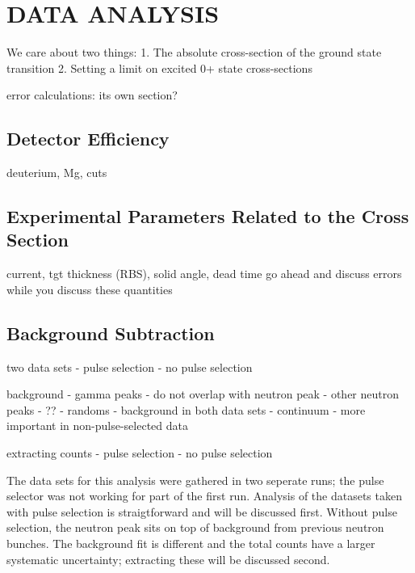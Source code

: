 %
%
%
%
%
%
%
%

%
%

\chapter{DATA ANALYSIS}
\label{chap:dataAnalysis}
We care about two things:
1. The absolute cross-section of the ground state transition
2. Setting a limit on excited 0+ state cross-sections

error calculations: its own section?

\section{Detector Efficiency}

deuterium, Mg, cuts

\section{Experimental Parameters Related to the Cross Section}
current, tgt thickness (RBS), solid angle, dead time
go ahead and discuss errors while you discuss these quantities

\section{Background Subtraction}

two data sets
- pulse selection
- no pulse selection

background
- gamma peaks - do not overlap with neutron peak
- other neutron peaks - ??
- randoms - background in both data sets
- continuum - more important in non-pulse-selected data

extracting counts 
- pulse selection
- no pulse selection

The data sets for this analysis were gathered in two seperate runs; the pulse selector was not working for part of the first run.  Analysis of the datasets taken with pulse selection is straigtforward and will be discussed first.  Without pulse selection, the neutron peak sits on top of background from previous neutron bunches.  The background fit is different and the total counts have a larger systematic uncertainty; extracting these will be discussed second.

